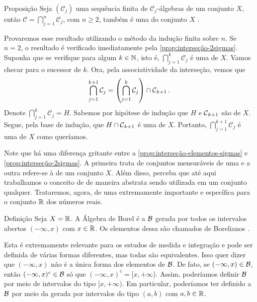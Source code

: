 \begin{env}{Proposição}
\label{prop:interseção-sigmas}
    Seja $(\mathcal{C}_j)$ uma sequência finita de $\mathcal{C}_j$-álgebras de um conjunto $X$, então 
    $\mathcal{C} = \displaystyle \bigcap_{j =1}^n\mathcal{C}_j$, com $n \geq 2$, também é uma \sigal do conjunto $X$ \cite{magalhaes}.
\end{env}
\begin{prova}
    Provaremos esse resultado utilizando o método da indução finita sobre $n$.
    Se $n = 2$, o resultado é verificado imediatamente pela  \ref{prop:interseção-2sigmas}.
    Suponha que se verifique para algum $k \in \operatorname{\mathbb{N}}$, isto é, $\displaystyle \bigcap_{j =1}^k\mathcal{C}_j$ é uma \sigal de $X$.
    Vamos checar para o sucessor de $k$.
    Ora, pela associatividade da interseção, vemos que 
    \begin{align*}
        \displaystyle \bigcap_{j =1}^{k+1}\mathcal{C}_j = \left(\displaystyle \bigcap_{j =1}^k\mathcal{C}_j\right) \cap \operatorname{\mathcal{C}}_{k+1}.
  	\end{align*}
	Denote $\displaystyle \bigcap_{j =1}^k\mathcal{C}_j = H$. 
	Sabemos por hipótese de indução que $H$  e $\operatorname{\mathcal{C}}_{k+1}$ são  \sigals de $X$. 
	Segue, pela base de indução, que $H \cap \operatorname{\mathcal{C}}_{k+1}$ é uma \sigal de $X$.
	Portanto, $\displaystyle \bigcap_{j =1}^{k+1}\mathcal{C}_j$ é uma \sigal de $X$ como queríamos.
\end{prova}

Note que há uma diferença gritante entre a \ref{prop:interseção-elementos-sigmas} e \ref{prop:interseção-2sigmas}.
A primeira trata de conjuntos mensuráveis de uma \sigal e a outra refere-se à \sigals de um conjunto $X$.
Além disso, perceba que até aqui trabalhamos o conceito de \sigal de maneira abstrata sendo utilizada em um conjunto qualquer. 
Trataremos, agora, de uma \sigal extremamente importante e específica para o conjunto $\mathbb{R}$ dos números reais.

\begin{env}{Definição}
\label{def:algebra-borel}
    Seja $X = \mathbb{R}$. A Álgebra de Borel é a \sigal $\operatorname{\mathcal{B}}$ gerada por todos os intervalos abertos $(-\infty,x)$ com $ x  \in \mathbb{R}$. 
    Os elementos dessa \sigal são chamados de Borelianos \cite{magalhaes}.
    \vspace{-0.2cm}
\end{env}

Esta \sigal é extremamente relevante para os estudos de medida e integração e pode ser definida de várias formas diferentes, mas todas são equivalentes.
Isso quer dizer que $(-\infty, x)$ não é a única forma dos elementos de $\operatorname{\mathcal{B}}$. 
De fato, se  $(-\infty, x) \in \operatorname{\mathcal{B}}$, então $(-\infty, x)^c \in \operatorname{\mathcal{B}}$ só que $(-\infty, x)^c = [x, +\infty$).
Assim, poderíamos  definir  $\operatorname{\mathcal{B}}$ por meio de intervalos do tipo $[x, +\infty)$.
Em particular, poderíamos ter definido a $\operatorname{\mathcal{B}}$ por meio da \sigal gerada por intervalos do tipo $(a,b)$ com $a,b \in \mathbb{R}$. 

